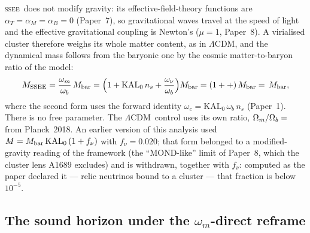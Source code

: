 \documentclass[12pt,a4paper]{article}
\newcommand{\SSEE}{\ifmmode\mathrm{SSEE}\else\textsc{ssee}\fi}
\newcommand{\LCDM}{\ifmmode\Lambda\mathrm{CDM}\else$\Lambda$CDM\fi}
\newcommand{\Mssee}{M_{\mathrm{SSEE}}}
\begin{document}
\SSEE\ does not modify gravity: its effective-field-theory functions are
$\alpha_T=\alpha_M=\alpha_B=0$ (Paper~7), so gravitational waves travel at the
speed of light and the effective gravitational coupling is Newton's ($\mu=1$,
Paper~8). A virialised cluster therefore weighs its whole matter content, as in
\LCDM, and the dynamical mass follows from the baryonic one by the cosmic
matter-to-baryon ratio of the model:
\begin{equation}
  \Mssee = \frac{\omega_m}{\omega_b}\,M_{\rm bar}
  = \Bigl(1+\mathrm{KAL_0}\,n_s+\frac{\omega_\nu}{\omega_b}\Bigr)M_{\rm bar}
  = (1+\val{clz_cdm}+\val{clz_nu})\,M_{\rm bar}=\val{clz_K_rg}\,M_{\rm bar},
  \label{eq:Mcluster}
\end{equation}
where the second form uses the forward identity $\omega_c=\mathrm{KAL_0}\,\omega_b\,n_s$
(Paper~1). There is no free parameter. The \LCDM\ control uses its own ratio,
$\Omega_m/\Omega_b=\val{clz_K_lcdm}$ from Planck~2018.
An earlier version of this analysis used
$M=M_{\rm bar}\,\mathrm{KAL_0}\,(1+f_\nu)$ with $f_\nu=0.020$; that form belonged
to a modified-gravity reading of the framework (the ``MOND-like'' limit of
Paper~8, which the cluster lens A1689 excludes) and is withdrawn, together with
$f_\nu$: computed as the paper declared it --- relic neutrinos bound to a cluster
--- that fraction is below $10^{-5}$.%

\subsection{The sound horizon under the $\omega_m$-direct reframe}
\label{sec:folding}
\end{document}
